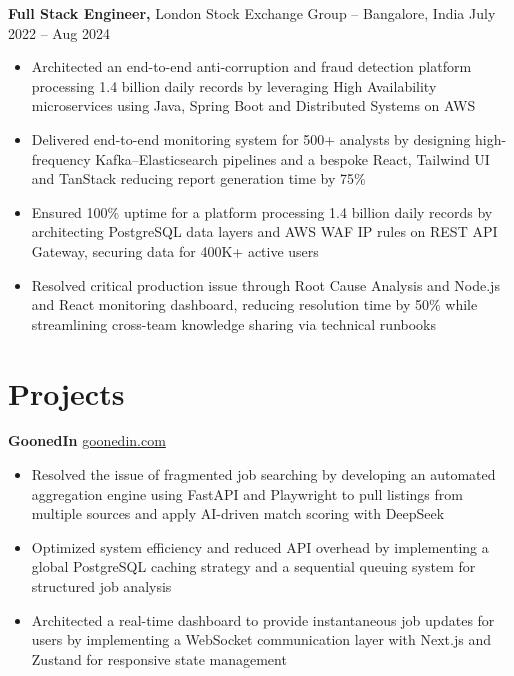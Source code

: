 \documentclass[11pt]{article}       %
\begin{document}
\textbf{Full Stack Engineer,} {London Stock Exchange Group} -- Bangalore, India \hfill July 2022 -- Aug 2024 \\
\vspace{-9pt}
\begin{itemize}
    \item Architected an end-to-end anti-corruption and fraud detection platform processing 1.4 billion daily records by leveraging High Availability microservices using Java, Spring Boot and Distributed Systems on AWS
    \item Delivered end-to-end monitoring system for 500+ analysts by designing high-frequency Kafka–Elasticsearch pipelines and a bespoke React, Tailwind UI and TanStack reducing report generation time by 75\%
    \item Ensured 100\% uptime for a platform processing 1.4 billion daily records by architecting PostgreSQL data layers and AWS WAF IP rules on REST API Gateway, securing data for 400K+ active users
    \item Resolved critical production issue through Root Cause Analysis and Node.js and React monitoring dashboard, reducing resolution time by 50\% while streamlining cross-team knowledge sharing via technical runbooks
\end{itemize}

\vspace{-18.5pt}

\section*{Projects}
\textbf{GoonedIn} \hfill \href{https://goonedin.vercel.app/}{goonedin.com} \\
\vspace{-9pt}
\begin{itemize}
  \item Resolved the issue of fragmented job searching by developing an automated aggregation engine using FastAPI and Playwright to pull listings from multiple sources and apply AI-driven match scoring with DeepSeek
  \item Optimized system efficiency and reduced API overhead by implementing a global PostgreSQL caching strategy and a sequential queuing system for structured job analysis
  \item Architected a real-time dashboard to provide instantaneous job updates for users by implementing a WebSocket communication layer with Next.js and Zustand for responsive state management
\end{itemize}
\end{document}
